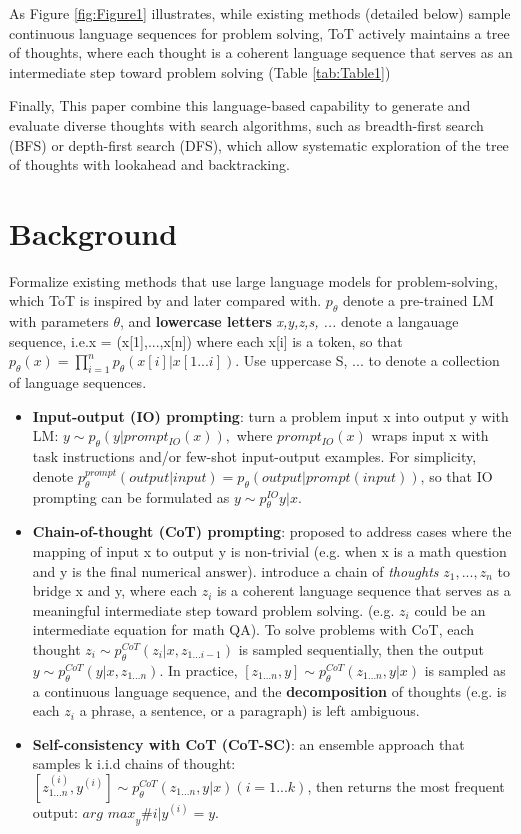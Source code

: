 \documentclass{article}
\begin{document}
As Figure \ref{fig:Figure1} illustrates, while existing methods (detailed below) sample continuous language sequences for problem solving, ToT actively maintains a tree of thoughts, where each thought is a coherent language sequence that serves as an intermediate step toward problem solving (Table \ref{tab:Table1})

Finally, This paper combine this language-based capability to generate and evaluate diverse thoughts with search algorithms, such as breadth-first search (BFS) or depth-first search (DFS), which allow systematic exploration of the tree of thoughts with lookahead and backtracking.


\section{Background}

Formalize existing methods that use large language models for problem-solving, which ToT is inspired 
by and later compared with. $p_{\theta}$ denote a pre-trained LM with parameters $\theta$, and 
\textbf{lowercase letters} \textit{x,y,z,s, ...} denote a langauage sequence, i.e.x = (x[1],...,x[n])
 where each x[i] is a token, so that $p_{\theta}(x) = \prod_{i=1}^{n}p_{\theta}(x[i]|x[1...i])$. Use uppercase 
 S, ... to denote a collection of language sequences.

\begin{itemize}
    \item \textbf{Input-output (IO) prompting}: turn a problem input x into output y with LM: $y\sim p_{\theta}(y|prompt_{IO}(x)),
    $ where $prompt_{IO}(x)$ wraps input x with task instructions and/or few-shot input-output examples. For simplicity, denote $p^{prompt}_{\theta}(output|input)=p_{\theta}(output|prompt(input))$,
     so that IO prompting can be formulated as $y \sim p_{\theta}^{IO}{y|x}$.
    \item \textbf{Chain-of-thought (CoT) prompting}: proposed to address cases where the mapping of input x to output y is non-trivial (e.g. when x is a math question and y is the final numerical answer).
    introduce a chain of \textit{thoughts} $z_1, ... , z_n$ to bridge x and y, where each $z_i$ is a coherent language sequence that serves as a meaningful intermediate step toward problem solving. (e.g. $z_i$ could be an intermediate equation for math QA).
    To solve problems with CoT, each thought $z_i \sim p^{CoT}_{\theta}(z_i | x, z_{1...i-1})$ is sampled sequentially, then the output $y \sim p^{CoT}_{\theta}(y|x,z_{1...n})$. In practice, $[z_{1...n},y] \sim p^{CoT}_{\theta}(z_{1...n},y | x)$ 
    is sampled as a continuous language sequence, and the \textbf{decomposition} of thoughts (e.g. is each $z_i$ a phrase, a sentence, or a paragraph) is left ambiguous.
    \item \textbf{Self-consistency with CoT (CoT-SC)}: an ensemble approach that samples k i.i.d chains of thought: 
    $[z_{1...n}^{(i)},y^{(i)}]\sim p^{CoT}_{\theta}(z_{1...n},y|x)(i=1...k)$, then returns the most frequent output: $\textit{arg max}_y \# {i|y^{(i)}=y}.$

\end{itemize}
\end{document}
